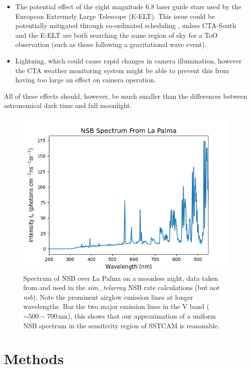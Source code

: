 \begin{itemize}
    \item The potential effect of the eight magnitude 6.8 laser guide stars used by the European Extremely Large Telescope (E-ELT). This issue could be potentially mitigated through co-ordinated scheduling \cite{gauglasers}, unless CTA-South and the E-ELT are both searching the same region of sky for a ToO observation (such as those following a gravitational wave event).
    \item Lightning, which could cause rapid changes in camera illumination, however the CTA weather monitoring system might be able to prevent this from having too large an effect on camera operation.
\end{itemize}
All of these effects should, however, be much smaller than the differences between astronomical dark time and full moonlight.
\begin{figure}[ht]
\begin{centering}
\includegraphics[width=\columnwidth]{./figures/bandeplot.png}
\caption{Spectrum of NSB over La Palma on a moonless night, data taken from \cite{BandE} and used in the \textit{sim\_telarray} NSB rate calculations (but not \textit{nsb}). Note the prominent airglow emission lines at longer wavelengths. Bar the two major emission lines in the V band ($\mathrm{\sim500-700\,nm}$), this shows that our approximation of a uniform NSB spectrum in the sensitivity region of SSTCAM is reasonable.}
\label{fig:BandE}
\end{centering}
\end{figure}

\section{Methods}


